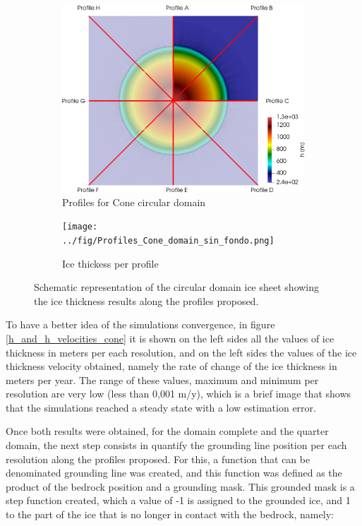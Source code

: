 \documentclass{article}
\begin{document}
\begin{figure}
	\centering
	\begin{subfigure}{.5\textwidth}
		\centering
		\includegraphics[width=0.99\linewidth]{../fig/Profiles_Cone_combined_domains.png}
		\caption{Profiles for Cone circular domain}
		\label{Schematic_Cone}
	\end{subfigure}%
	\begin{subfigure}{.5\textwidth}
		\centering
		\texttt{[image: ../fig/Profiles\_Cone\_domain\_sin\_fondo.png]}
		\caption{Ice thickess per profile}
		\label{Profiles_cone}
	\end{subfigure}
	\caption{Schematic representation of the circular domain ice sheet showing the ice thickness results along the profiles proposed.}
	\label{Cone_scheme}
\end{figure}

To have a better idea of the simulations convergence, in figure \ref{h_and_h_velocities_cone} it is shown on the left sides all the values of ice thickness in meters per each resolution, and on the left sides the values of the ice thickness velocity obtained, namely the rate of change of the ice thickness in meters per year. The range of these values, maximum and minimum per resolution are very low (less than 0,001 m/y), which is a brief image that shows that the simulations reached a steady state with a low estimation error. 

Once both results were obtained, for the domain complete and the quarter domain, the next step consists in quantify the grounding line position per each resolution along the profiles proposed. For this, a function that can be denominated grounding line was created, and this function was defined as the product of the bedrock position and a grounding mask. This grounded mask is a step function created, which a value of -1 is assigned to the grounded ice, and 1 to the part of the ice that is no longer in contact with the bedrock, namely:
\end{document}
